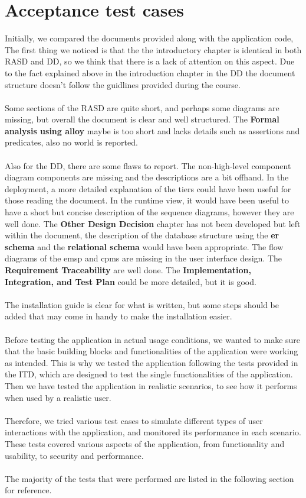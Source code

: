 \chapter{Acceptance test cases}
Initially, we compared the documents provided along with the application code, The first thing we noticed is that the the introductory chapter is identical in both RASD and DD, so we think that there is a lack of attention on this aspect.
Due to the fact explained above in the introduction chapter in the DD the document structure doesn't follow the guidlines provided during the course.
\\\\
Some sections of the RASD are quite short, and perhaps some diagrams are missing, but overall the document is clear and well structured. The \textbf{Formal analysis using alloy} maybe is too short and lacks details such as assertions and predicates, also no world is reported.
\\\\
Also for the DD, there are some flaws to report. The non-high-level component diagram components are missing and the descriptions are a bit offhand. In the deployment, a more detailed explanation of the tiers could have been useful for those reading the document. In the runtime view, it would have been useful to have a short but concise description of the sequence diagrams, however they are well done. The \textbf{Other Design Decision} chapter has not been developed but left within the document, the description of the database structure using the \textbf{er schema} and the \textbf{relational schema} would have been appropriate. The flow diagrams of the emsp and cpms are missing in the user interface design. The \textbf{Requirement Traceability} are well done. The \textbf{Implementation, Integration, and Test Plan} could be more detailed, but it is good.
\\\\
The installation guide is clear for what is written, but some steps should be added that may come in handy to make the installation easier.
\\\\
Before testing the application in actual usage conditions, we wanted to make sure that the basic building blocks and functionalities of the application were working as intended. This is why we tested the application following the tests provided in the ITD, which are designed to test the single functionalities of the application.
\\
Then we have tested the application in realistic scenarios, to see how it performs when used by a realistic user.
\\\\
Therefore, we tried various test cases to simulate different types of user interactions with the application, and monitored its performance in each scenario. These tests covered various aspects of the application, from functionality and usability, to security and performance. 
\\\\
The majority of the tests that were performed are listed in the following section for reference.
\clearpage

